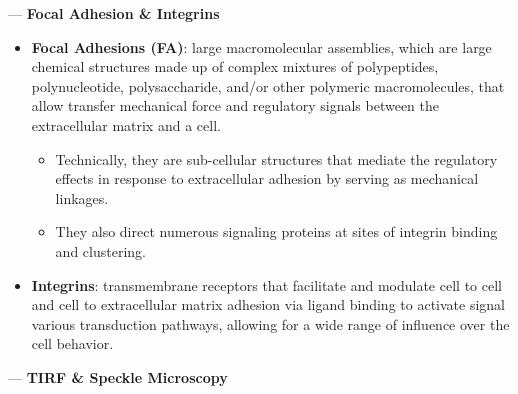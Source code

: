 \documentclass[basic,plain]{inVerba-notes}
\begin{document}
 --- \textbf{Focal Adhesion \& Integrins}
\begin{itemize}
  \item \textbf{Focal Adhesions (FA)}: large macromolecular assemblies, which are large chemical structures made up of complex mixtures of polypeptides, polynucleotide, polysaccharide, and/or other polymeric macromolecules, that allow transfer mechanical force and regulatory signals between the extracellular matrix and a cell. 
    \begin{itemize}
      \item Technically, they are sub-cellular structures that mediate the regulatory effects in response to  extracellular adhesion by serving as mechanical linkages. 
      \item They also direct numerous signaling proteins at sites of integrin binding and clustering.
    \end{itemize}
  \item \textbf{Integrins}: transmembrane receptors that facilitate and modulate cell to cell and cell to extracellular matrix adhesion via ligand binding to activate signal various transduction pathways, allowing for a wide range of influence over the cell behavior.
\end{itemize}

\medskip

 --- \textbf{TIRF \& Speckle Microscopy}
\end{document}
